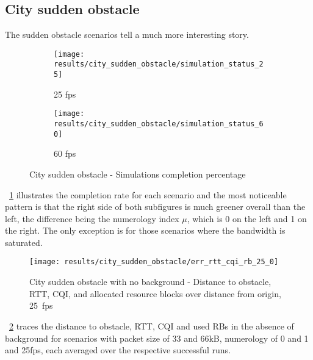 

\pagebreak
\subsection{City sudden obstacle}
The sudden obstacle scenarios tell a much more interesting story. 

\begin{figure}[H]
    \centering
    \begin{subfigure}[b]{0.95\textwidth}
        \centering
        \texttt{[image: results/city\_sudden\_obstacle/simulation\_status\_25]}
        \caption{25 fps}
    \end{subfigure}
    \hfill
    \begin{subfigure}[b]{0.95\textwidth}
        \centering
        \texttt{[image: results/city\_sudden\_obstacle/simulation\_status\_60]}
        \caption{60 fps}
    \end{subfigure}
    \caption{City sudden obstacle - Simulations completion percentage}
    \label{fig:city_sudden_obstacle_completion_percentage}
\end{figure}

\figurename~\ref{fig:city_sudden_obstacle_completion_percentage} illustrates the completion rate for each scenario and the most noticeable pattern is that the right side of both subfigures is much greener overall than the left, the difference being the numerology index $\mu$, which is 0 on the left and 1 on the right. The only exception is for those scenarios where the bandwidth is saturated.

\begin{figure}[H]
    \centering
    \texttt{[image: results/city\_sudden\_obstacle/err\_rtt\_cqi\_rb\_25\_0]}
    \caption{City sudden obstacle with no background - Distance to obstacle, RTT, CQI, and allocated resource blocks over distance from origin, 25~fps}
    \label{fig:city_sudden_obstacle_err_rtt_cqi_rb_25_0}
\end{figure}

\figurename~\ref{fig:city_sudden_obstacle_err_rtt_cqi_rb_25_0} traces the distance to obstacle, RTT, CQI and used RBs in the absence of background for scenarios with packet size of 33 and 66kB, numerology of 0 and 1 and 25fps, each averaged over the respective successful runs.


